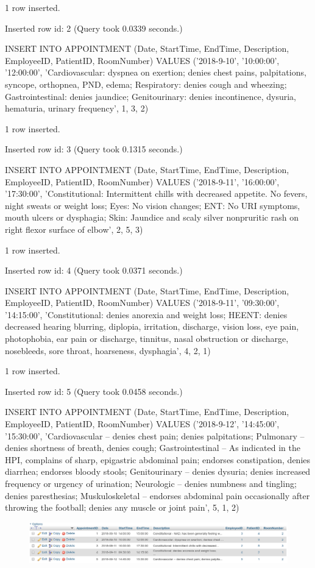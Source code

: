 \documentclass[11pt]{article}
\makeatletter
\def\maxwidth{\ifdim\Gin@nat@width>\linewidth\linewidth
    \else\Gin@nat@width\fi}
\let\Oldincludegraphics\includegraphics
\renewcommand{\includegraphics}[1]{\Oldincludegraphics[width=.8\maxwidth]{#1}}
\makeatother
\begin{document}
1 row inserted.

Inserted row id: 2 (Query took 0.0339 seconds.)

INSERT INTO APPOINTMENT (Date, StartTime, EndTime, Description,
EmployeeID, PatientID, RoomNumber) VALUES ('2018-9-10', '10:00:00',
'12:00:00', 'Cardiovascular: dyspnea on exertion; denies chest pains,
palpitations, syncope, orthopnea, PND, edema; Respiratory: denies cough
and wheezing; Gastrointestinal: denies jaundice; Genitourinary: denies
incontinence, dysuria, hematuria, urinary frequency', 1, 3, 2)

1 row inserted.

Inserted row id: 3 (Query took 0.1315 seconds.)

INSERT INTO APPOINTMENT (Date, StartTime, EndTime, Description,
EmployeeID, PatientID, RoomNumber) VALUES ('2018-9-11', '16:00:00',
'17:30:00', 'Constitutional: Intermittent chills with decreased
appetite. No fevers, night sweats or weight loss; Eyes: No vision
changes; ENT: No URI symptoms, mouth ulcers or dysphagia; Skin: Jaundice
and scaly silver nonpruritic rash on right flexor surface of elbow', 2,
5, 3)

1 row inserted.

Inserted row id: 4 (Query took 0.0371 seconds.)

INSERT INTO APPOINTMENT (Date, StartTime, EndTime, Description,
EmployeeID, PatientID, RoomNumber) VALUES ('2018-9-11', '09:30:00',
'14:15:00', 'Constitutional: denies anorexia and weight loss; HEENT:
denies decreased hearing blurring, diplopia, irritation, discharge,
vision loss, eye pain, photophobia, ear pain or discharge, tinnitus,
nasal obstruction or discharge, nosebleeds, sore throat, hoarseness,
dysphagia', 4, 2, 1)

1 row inserted.

Inserted row id: 5 (Query took 0.0458 seconds.)

INSERT INTO APPOINTMENT (Date, StartTime, EndTime, Description,
EmployeeID, PatientID, RoomNumber) VALUES ('2018-9-12', '14:45:00',
'15:30:00', 'Cardiovascular -- denies chest pain; denies palpitations;
Pulmonary -- denies shortness of breath, denies cough; Gastrointestinal
-- As indicated in the HPI, complains of sharp, epigastric abdominal
pain; endorses constipation, denies diarrhea; endorses bloody stools;
Genitourinary -- denies dysuria; denies increased frequency or urgency
of urination; Neurologic -- denies numbness and tingling; denies
paresthesias; Muskuloskeletal -- endorses abdominal pain occasionally
after throwing the football; denies any muscle or joint pain', 5, 1, 2)

    \begin{figure}[H]
\centering
\includegraphics{appointment_2.png}
\caption{}
\end{figure}


    
    
    
    
\end{document}
